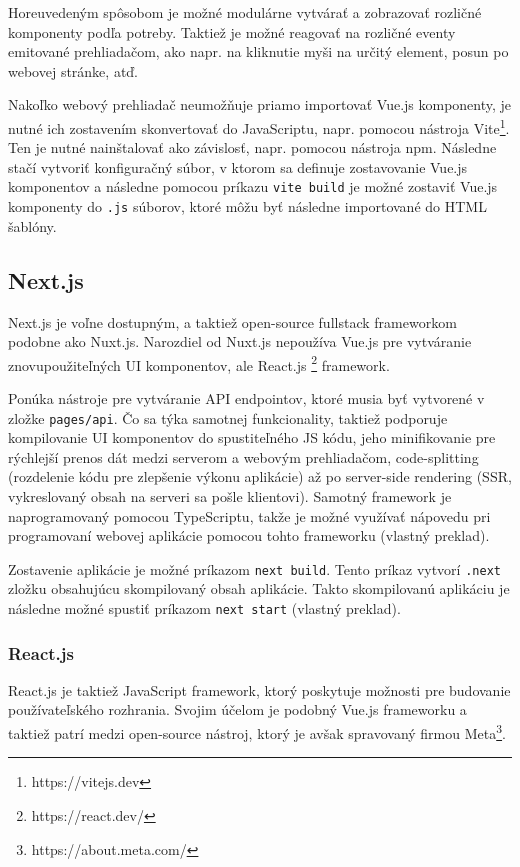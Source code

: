 Horeuvedeným spôsobom je možné modulárne vytvárať a zobrazovať rozličné komponenty podľa potreby. Taktiež je možné reagovať na rozličné eventy emitované prehliadačom, ako napr. na kliknutie myši na určitý element, posun po webovej stránke, atď.

Nakoľko webový prehliadač neumožňuje priamo importovať Vue.js komponenty, je nutné ich zostavením skonvertovať do JavaScriptu, napr. pomocou nástroja Vite\footnote{https://vitejs.dev}. Ten je nutné nainštalovať ako závislosť, napr. pomocou nástroja npm. Následne stačí vytvoriť konfiguračný súbor, v ktorom sa definuje zostavovanie Vue.js komponentov a následne pomocou príkazu \texttt{vite build} je možné zostaviť Vue.js komponenty do \texttt{.js} súborov, ktoré môžu byť následne importované do HTML šablóny.

\subsection {Next.js}
Next.js je voľne dostupným, a taktiež open-source fullstack frameworkom podobne ako Nuxt.js. Narozdiel od Nuxt.js nepoužíva Vue.js pre vytváranie znovupoužiteľných UI komponentov, ale React.js \footnote{https://react.dev/} framework.

Ponúka nástroje pre vytváranie API endpointov, ktoré musia byť vytvorené v zložke \texttt{pages/api}. Čo sa týka samotnej funkcionality, taktiež podporuje kompilovanie UI komponentov do spustiteľného JS kódu, jeho minifikovanie pre rýchlejší prenos dát medzi serverom a webovým prehliadačom, code-splitting (rozdelenie kódu pre zlepšenie výkonu aplikácie) až po server-side rendering (SSR, vykreslovaný obsah na serveri sa pošle klientovi). Samotný framework je naprogramovaný pomocou TypeScriptu, takže je možné využívať nápovedu pri programovaní webovej aplikácie pomocou tohto frameworku \cite{nextjs_introduction} (vlastný preklad).

Zostavenie aplikácie je možné príkazom \texttt{next build}. Tento príkaz vytvorí \texttt{.next} zložku obsahujúcu skompilovaný obsah aplikácie. Takto skompilovanú aplikáciu je následne možné spustiť príkazom \texttt{next start} \cite{nextjs_introduction} (vlastný preklad). 

\subsubsection {React.js}
React.js je taktiež JavaScript framework, ktorý poskytuje možnosti pre budovanie používateľského rozhrania. Svojim účelom je podobný Vue.js frameworku a taktiež patrí medzi open-source nástroj, ktorý je avšak spravovaný firmou Meta\footnote{https://about.meta.com/}.

